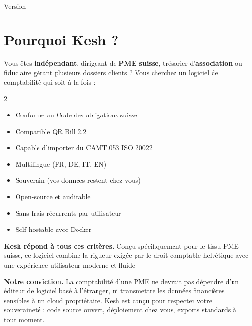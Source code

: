 \documentclass[a4paper,11pt,oneside]{article}
\begin{document}
\begin{titlepage}
\begin{center}
        \vspace{0.5cm}

        {\sffamily\small\color{white}Version \textbf{\keshVersion} \quad\textbar\quad \keshReleaseDate \quad\textbar\quad \keshWebsite}
    \end{center}
\end{titlepage}


\section*{\color{keshPrimary}Pourquoi Kesh ?}

Vous êtes \textbf{indépendant}, dirigeant de \textbf{PME suisse}, trésorier d'\textbf{association} ou fiduciaire gérant plusieurs dossiers clients ? Vous cherchez un logiciel de comptabilité qui soit à la fois :

\begin{multicols}{2}
\begin{itemize}
    \item[\faCheckCircle] Conforme au Code des obligations suisse
    \item[\faCheckCircle] Compatible QR Bill 2.2
    \item[\faCheckCircle] Capable d'importer du CAMT.053 ISO 20022
    \item[\faCheckCircle] Multilingue (FR, DE, IT, EN)
    \item[\faCheckCircle] Souverain (vos données restent chez vous)
    \item[\faCheckCircle] Open-source et auditable
    \item[\faCheckCircle] Sans frais récurrents par utilisateur
    \item[\faCheckCircle] Self-hostable avec Docker
\end{itemize}
\end{multicols}

\textbf{Kesh répond à tous ces critères.} Conçu spécifiquement pour le tissu PME suisse, ce logiciel combine la rigueur exigée par le droit comptable helvétique avec une expérience utilisateur moderne et fluide.

\vspace{0.5cm}

\begin{keshtip}
\textbf{Notre conviction.} La comptabilité d'une PME ne devrait pas dépendre d'un éditeur de logiciel basé à l'étranger, ni transmettre les données financières sensibles à un cloud propriétaire. Kesh est conçu pour respecter votre souveraineté : code source ouvert, déploiement chez vous, exports standards à tout moment.
\end{keshtip}
\end{document}
